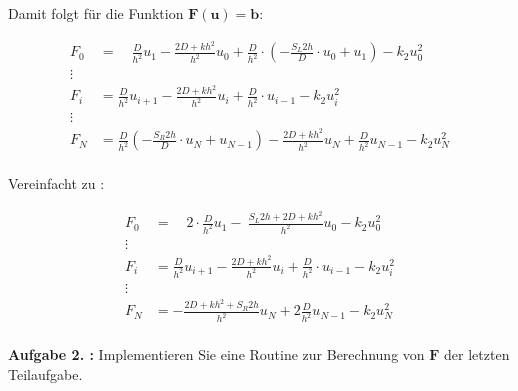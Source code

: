 Damit folgt für die Funktion $\mathbf{F}(\mathbf{u})=\mathbf{b}$:

\begin{align*}
	F_0 & = \quad
	\frac{D}{h^2}u_1-\frac{2D+kh^2}{h^2}u_0+\frac{D}{h^2}\cdot\left( -\frac{S_L
	2h}{D}\cdot u_0+u_1\right) -k_2u_0^2                                  \\
	\vdots                                                                \\
	F_i & =	\frac{D}{h^2}u_{i+1}-\frac{2D+kh^2}{h^2}u_i+\frac{D}{h^2}\cdot
	u_{i-1} -k_2u_i^2                                                     \\
	\vdots                                                                \\
	F_N & = \frac{D}{h^2}\left( -\frac{S_R2h}{D}\cdot u_N+u_{N-1}\right)
	-\frac{2D+kh^2}{h^2}u_N+\frac{D}{h^2} u_{N-1}-k_2u^2_N                \\
\end{align*}

\begin{qed}
	Vereinfacht zu :

	\begin{align*}
		F_0 & = \quad 2\cdot \frac{D}{h^2}u_1-\ \frac{S_L2h+2D+kh^2}{h^2}
		u_0 -k_2u_0^2                                                     \\
		\vdots                                                            \\
		F_i & =
		\frac{D}{h^2}u_{i+1}-\frac{2D+kh^2}{h^2}u_i+\frac{D}{h^2}\cdot u_{i-1}
		-k_2u_i^2                                                         \\
		\vdots                                                            \\
		F_N & =
		-\frac{2D+kh^2+S_R2h}{h^2}u_N+2\frac{D}{h^2}u_{N-1}-k_2u^2_N      \\
	\end{align*}
\end{qed}

\begin{mybox}
	\textbf{Aufgabe 2. :} Implementieren Sie eine Routine zur Berechnung
	von $\mathbf{F}$ der letzten Teilaufgabe.\cite{Prof.Dr.AndreasZeiser.April2021}
\end{mybox}

\begin{figure}[htb]
	
\end{figure}

